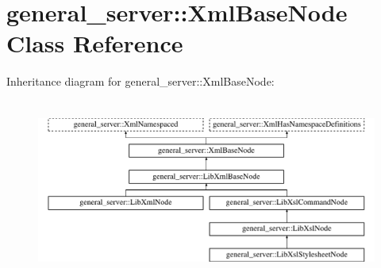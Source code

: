 \hypertarget{classgeneral__server_1_1XmlBaseNode}{\section{general\-\_\-server\-:\-:\-Xml\-Base\-Node \-Class \-Reference}
\label{classgeneral__server_1_1XmlBaseNode}
}
\-Inheritance diagram for general\-\_\-server\-:\-:\-Xml\-Base\-Node\-:\begin{figure}[H]
\begin{center}
\leavevmode
\includegraphics[height=5.978648cm]{classgeneral__server_1_1XmlBaseNode}
\end{center}
\end{figure}

